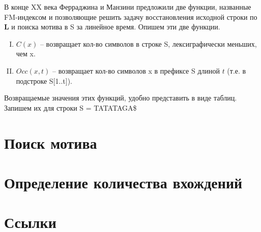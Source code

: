 \documentclass[letterpaper, 11pt]{article}
\begin{document}
В конце XX века Ферраджина и Манзини предложили две функции, названные FM-индексом и позволяющие решить задачу восстановления исходной строки по \textbf{L} и поиска мотива в S за линейное время. Опишем эти две функции.
\begin{enumerate}[I.]
\item
$C(x)$ -- возвращает кол-во символов в строке S, лексиграфически меньших, чем x.
\item
$Occ(x, t)$ -- возвращает кол-во символов x в префиксе S длиной $t$ (т.е. в подстроке S[1..t]).
\end{enumerate}

Возвращаемые значения этих функций, удобно представить в виде таблиц. Запишем их для строки S = TATATAGA\$

\begin{table}[H]
\caption{$C(x)$}
\end{table}

\begin{table}[H]
\caption{$Occ(x, t)$}
\end{table}

\section{Поиск мотива}
\section{Определение количества вхождений}
\section{Ссылки}
\end{document}
